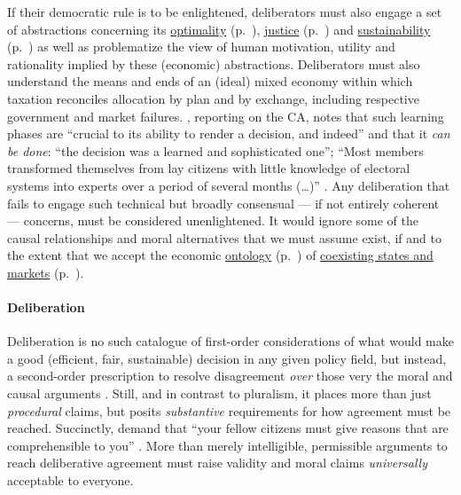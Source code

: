 If their democratic rule is to be enlightened, deliberators must also engage a set of abstractions concerning its \hyperref[sec:tax-optimality]{optimality} (p.~\pageref{sec:tax-optimality}), \hyperref[sec:tax-justice]{justice} (p.~\pageref{sec:tax-justice}) and \hyperref[sec:tax-sustainability]{sustainability} (p.~\pageref{sec:tax-sustainability}) as well as problematize the view of human motivation, utility and rationality implied by these (economic) abstractions.
Deliberators must also understand the means and ends of an (ideal) mixed economy within which taxation reconciles allocation by plan and by exchange, including respective government and market failures.
\citeauthor[K1513]{Warren2008}, reporting on the \gls{CA}, notes that such learning phases are ``crucial to its ability to  render a decision, and indeed'' and that it \emph{can be done}: ``the decision was a learned and sophisticated one''; 
``Most members transformed themselves from lay citizens with little knowledge of electoral systems into experts over a period of several months (\ldots)'' \citeyearpar[K1513]{Warren2008}.
Any deliberation that fails to engage such technical but broadly consensual --- if not entirely coherent --- concerns, must be considered unenlightened. 
It would ignore some of the causal relationships and moral alternatives that we must assume exist, if and to the extent that we accept the economic \hyperref[sec:ontology]{ontology} (p.~\pageref{sec:ontology}) of \hyperref[chap:mixed-economy]{coexisting states and markets} (p.~\pageref{chap:mixed-economy}).

\paragraph{Deliberation}
Deliberation is no such catalogue of first-order considerations of what would make a good (efficient, fair, sustainable) decision in any given policy field, but instead, a second-order prescription to resolve disagreement \emph{over} those very the moral and causal arguments \citep[125]{GutmannThompson-2004-aa}.
Still, and in contrast to pluralism, it places more than just \emph{procedural} claims, but posits \emph{substantive} requirements for how agreement must be reached.
Succinctly, \citeauthor{GutmannThompson-2004-aa} demand that ``your fellow citizens must give reasons that are comprehensible to you'' \citeyearpar[K177]{GutmannThompson-2004-aa}.
More than merely intelligible, permissible arguments to reach deliberative agreement must raise validity \citep{Habermas-1984} and moral \citep{Rawls-1971} claims \emph{universally} acceptable to everyone.

